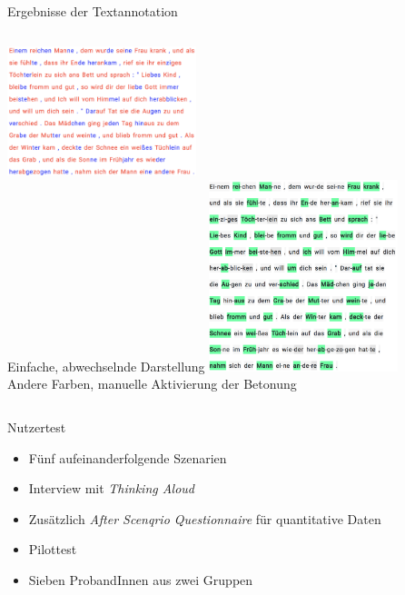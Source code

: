 \documentclass{beamer}
\begin{document}
\begin{frame}{Ergebnisse der Textannotation}
\begin{columns}[t]
	\centering
	\includegraphics[width=5.5cm]{../figures/evaluation/pre-annotation1}\\
	[0.5cm]
	Einfache, abwechselnde Darstellung
	\centering
	\includegraphics[width=5.5cm]{../figures/evaluation/pre-annotation3}\\
	[0.5cm]
	Andere Farben, manuelle Aktivierung der Betonung
\end{columns}
\end{frame}

\begin{frame}{Nutzertest}
\begin{itemize}
	\item Fünf aufeinanderfolgende Szenarien
	\item Interview mit \textit{Thinking Aloud}
	\item Zusätzlich \textit{After Scenqrio Questionnaire} für quantitative Daten
	\item Pilottest
	\item Sieben ProbandInnen aus zwei Gruppen
\end{itemize}
\end{frame}
\end{document}
